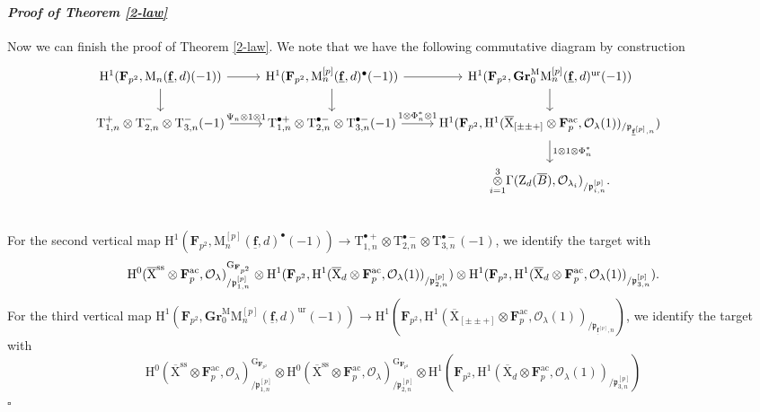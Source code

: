 \documentclass[10pt]{amsart}
\numberwithin{equation}{section}
\theoremstyle{plain}
\numberwithin{equation}{section}
\theoremstyle{definition}
\theoremstyle{remark}
\newenvironment{myproof}[2] {\paragraph{\emph{Proof of {#1} {#2} }}}{\hfill$\square$}
\def\ac{\mathrm{ac}}
\def\ss{\mathrm{ss}}
\def\ur{\mathrm{ur}}
\def\ac{\mathrm{ac}}
\def\triplef{\underline{\mathbf{f}}}
\def\threetensor{\overset{3}{\underset{i=1}\otimes}}
\def\calO{\mathcal{O}}
\def\frakp{\mathfrak{p}}
\def\FF{\mathbf{F}}
\def\rmG{\mathrm{G}}
\def\rmH{\mathrm{H}}
\def\rmM{\mathrm{M}}
\def\rmX{\mathrm{X}}
\def\rmXbar{\overline{\rmX}}
\def\rmT{\mathrm{T}}
\def\rmZ{\mathrm{Z}}
\newcommand{\Gr}{\mathbf{Gr}}
\begin{document}
\begin{myproof}{Theorem \ref{2-law}}{}
Now we can finish the proof of Theorem \ref{2-law}. We note that we have the following commutative diagram by construction
\begin{equation}\label{key-diag}
\begin{tikzcd}
\rmH^{1}(\FF_{p^{2}}, \rmM_{n}(\triplef, d)(-1)) \arrow[r] \arrow[d] & \rmH^{1}(\FF_{p^{2}}, \rmM^{[p]}_{n}(\triplef, d)^{\bullet}(-1))  \arrow[r] \arrow[d] & \rmH^{1}(\FF_{p^{2}}, \Gr^{\rmM}_{0}\rmM^{[p]}_{n}(\triplef,d)^{\ur}(-1)) \arrow[d] &             \\
\rmT^{+}_{1, n}\otimes\rmT^{-}_{2, n}\otimes \rmT^{-}_{3, n}(-1) \arrow[r, "\Psi_{n}\otimes1\otimes1"]           & \rmT^{\bullet+}_{1, n}\otimes\rmT^{\bullet-}_{2, n}\otimes \rmT^{\bullet-}_{3, n}(-1)  \arrow[r, "1\otimes\Phi^{\ast}_{n}\otimes1" ]                   & \rmH^{1}(\FF_{p^{2}}, \rmH^{1}(\rmXbar_{[\pm\pm+]}\otimes{\FF^{\ac}_{p}}, \calO_{\lambda}(1))_{/\frakp_{\triplef^{[p]}, n}})\arrow[d, "1\otimes1\otimes\Phi^{\ast}_{n}"] \\
& & \threetensor\Gamma(\rmZ_{d}(\overline{B}), \calO_{\lambda_{i}})_{/\frakp^{[p]}_{i, n}}.\\
\end{tikzcd}
\end{equation}
For the second vertical map $\rmH^{1}(\FF_{p^{2}}, \rmM^{[p]}_{n}(\triplef, d)^{\bullet}(-1))\rightarrow \rmT^{\bullet+}_{1, n}\otimes\rmT^{\bullet-}_{2, n}\otimes \rmT^{\bullet-}_{3, n}(-1)$, we identify the target with
\begin{equation*}
\rmH^{0}(\rmXbar^{\ss}\otimes\FF^{\ac}_{p},\calO_{\lambda})^{\rmG_{\FF_{p^{2}}}}_{/\frakp^{[p]}_{1, n}}\otimes\rmH^{1}(\FF_{p^{2}}, \rmH^{1}(\rmXbar_{d}\otimes{\FF^{\ac}_{p}}, \calO_{\lambda}(1))_{/\frakp^{[p]}_{2, n}})\otimes\rmH^{1}(\FF_{p^{2}}, \rmH^{1}(\rmXbar_{d}\otimes{\FF^{\ac}_{p}}, \calO_{\lambda}(1))_{/\frakp^{[p]}_{3, n}}). \\
\end{equation*}
For the third vertical map  $\rmH^{1}(\FF_{p^{2}}, \Gr^{\rmM}_{0}\rmM^{[p]}_{n}(\triplef,d)^{\ur}(-1))\rightarrow  \rmH^{1}(\FF_{p^{2}}, \rmH^{1}(\rmXbar_{[\pm\pm+]}\otimes{\FF^{\ac}_{p}}, \calO_{\lambda}(1))_{/\frakp_{\triplef^{[p]}, n}})$, we identify the target with
\begin{equation*}
 \rmH^{0}(\rmXbar^{\ss}\otimes\FF^{\ac}_{p},\calO_{\lambda})^{\rmG_{\FF_{p^{2}}}}_{/\frakp^{[p]}_{1, n}}\otimes\rmH^{0}(\rmXbar^{\ss}\otimes\FF^{\ac}_{p},\calO_{\lambda})^{\rmG_{\FF_{p^{2}}}}_{/\frakp^{[p]}_{2, n}}\otimes\rmH^{1}(\FF_{p^{2}}, \rmH^{1}(\rmXbar_{d}\otimes{\FF^{\ac}_{p}}, \calO_{\lambda}(1))_{/\frakp^{[p]}_{3, n}})

\end{equation*}
\end{myproof}
\end{document}

